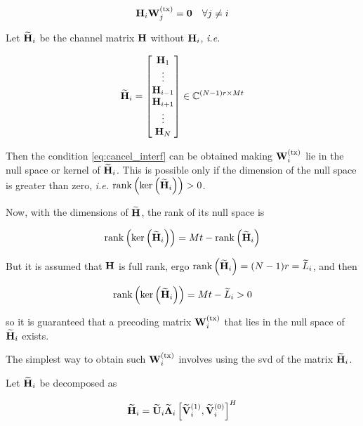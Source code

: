 \begin{equation} \label{eq:cancel_interf}
    \mathbf{H}_i \mathbf{W}^{(\text{tx})}_j = \mathbf{0} \text{\quad } \forall j \neq i
\end{equation}

Let $\mathbf{\widetilde{H}}_i$ be the channel matrix $\mathbf{H}$ without $\mathbf{H}_i$, \emph{i.e.}

\begin{equation} \label{eq:h_tilde}
    \mathbf{\widetilde{H}}_i = \begin{bmatrix}
        \mathbf{H}_1 \\
        \vdots \\
        \mathbf{H}_{i - 1} \\
        \mathbf{H}_{i + 1} \\
        \vdots \\
        \mathbf{H}_N
    \end{bmatrix} \in \mathbb{C}^{(N - 1)r \times Mt}
\end{equation}

Then the condition \eqref{eq:cancel_interf} can be obtained making $\mathbf{W}^{(\text{tx})}_i$ lie
in the null space or kernel of $\mathbf{\widetilde{H}}_i$. This is possible only if the
dimension of the null space is greater than zero, \emph{i.e.} $\operatorname*{rank}\left(\ker
\left(\mathbf{\widetilde{H}}_i\right)\right) > 0$.

Now, with the dimensions of $\mathbf{\widetilde{H}}$, the rank of its null space is

\begin{equation} \label{eq:rank_kern_htilde}
   \operatorname*{rank}\left(\ker\left(\mathbf{\widetilde{H}}_i\right)\right) = Mt - \operatorname*{rank}\left(\mathbf{\widetilde{H}}_i
   \right)
\end{equation}

But it is assumed that $\mathbf{H}$ is full rank, ergo $\operatorname*{rank}\left(\mathbf{\widetilde{H}}_i\right) =
(N - 1)r = \widetilde{L}_i$, and then

\begin{equation} \label{eq:rank_kern_htilde_ok}
    \operatorname*{rank}\left(\ker\left(\mathbf{\widetilde{H}}_i\right)\right) = Mt - \widetilde{L}_i > 0
\end{equation}

\noindent
so it is guaranteed that a precoding matrix $\mathbf{W}^{(\text{tx})}_i$ that lies in the null space
of $\mathbf{\widetilde{H}}_i$ exists.

The simplest way to obtain such $\mathbf{W}^{(\text{tx})}_i$ involves using the \gls{svd} of the
matrix $\mathbf{\widetilde{H}}_i$.

Let $\mathbf{\widetilde{H}}_i$ be decomposed as

\begin{equation} \label{eq:htilde_svd}
    \mathbf{\widetilde{H}}_i = \mathbf{\widetilde{U}}_i \mathbf{\widetilde{\Lambda}}_i \left[ \mathbf{\widetilde{V}}_i^{(1)}, \mathbf{\widetilde{V}}_i^{(0)}
    \right]^H
\end{equation}

